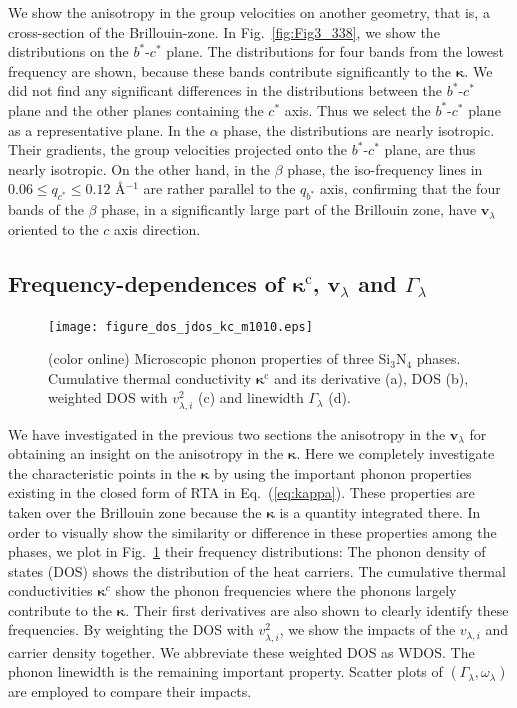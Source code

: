 \documentclass[twocolumn,amsmath,amssymb,a4paper,prb,superscriptaddress,floatfix]{revtex4-1}
\begin{document}
We show the anisotropy in the group velocities on another geometry, that is,  a
cross-section of the Brillouin-zone.  In Fig.~\ref{fig:Fig3_338}, we show the
distributions on the $b^*$-$c^*$ plane.  The distributions for four bands from
the lowest frequency are shown, because these bands contribute significantly to
the $\boldsymbol{\kappa}$.  We did not find any significant differences in the
distributions between the $b^*$-$c^*$ plane and the other planes containing the
$c^*$ axis.  Thus we select the $b^*$-$c^*$ plane as a representative plane.  In
the $\alpha$ phase, the distributions are nearly isotropic. Their gradients,
the group velocities projected onto the $b^*$-$c^*$ plane, are thus nearly
isotropic. On the other hand, in the $\beta$ phase, the iso-frequency lines in
$0.06 \le q_{c^*} \le 0.12$ \AA$^{-1}$ are rather parallel to the $q_{b^*}$
axis, confirming that the four bands of the $\beta$ phase, in a significantly
large part of the Brillouin zone, have $\mathbf{v}_\lambda$ oriented to the $c$
axis direction.

\subsection{Frequency-dependences of $\boldsymbol{\kappa}^\text{c}$, $\mathbf{v}$$_\lambda$ and $\Gamma_\lambda$}

\begin{figure}[ht]
 \begin{center}
  \texttt{[image: figure\_dos\_jdos\_kc\_m1010.eps]}
  \caption{(color online) Microscopic phonon properties of three Si$_3$N$_4$
	  phases. Cumulative thermal conductivity $\mathbf{\kappa}^\text{c}$ and its derivative
	  (a), DOS (b), weighted DOS with $v_{\lambda,i}^2$ (c) and linewidth $\Gamma_\lambda$ (d).
  \label{fig:Fig5_338_rev} }
 \end{center}
\end{figure}

We have investigated in the previous two sections the anisotropy in the
$\mathbf{v}_\lambda$ for obtaining an insight on the anisotropy in the
$\boldsymbol{\kappa}$. Here we completely investigate the characteristic points
in the $\boldsymbol{\kappa}$ by using the important phonon properties existing
in the closed form of RTA in Eq.~(\ref{eq:kappa}). These properties are taken
over the Brillouin zone because the $\boldsymbol{\kappa}$ is a quantity
integrated there. In order to visually show the similarity or difference in
these properties among the phases, we plot in Fig.~\ref{fig:Fig5_338_rev} their
frequency distributions: The phonon density of states (DOS)
shows the distribution of the heat carriers. The cumulative thermal
conductivities $\boldsymbol{\kappa}^c$ show the phonon frequencies where the
phonons largely contribute to the $\boldsymbol{\kappa}$. Their first derivatives
are also shown to clearly identify these frequencies. By weighting the DOS with
$v_{\lambda,i}^2$, we show the impacts of the $v_{\lambda,i}$ and carrier
density together. We abbreviate these weighted DOS as WDOS. The phonon
linewidth is the remaining important property. Scatter plots of
$(\Gamma_\lambda, \omega_\lambda)$  are employed to compare their impacts. 
\end{document}
